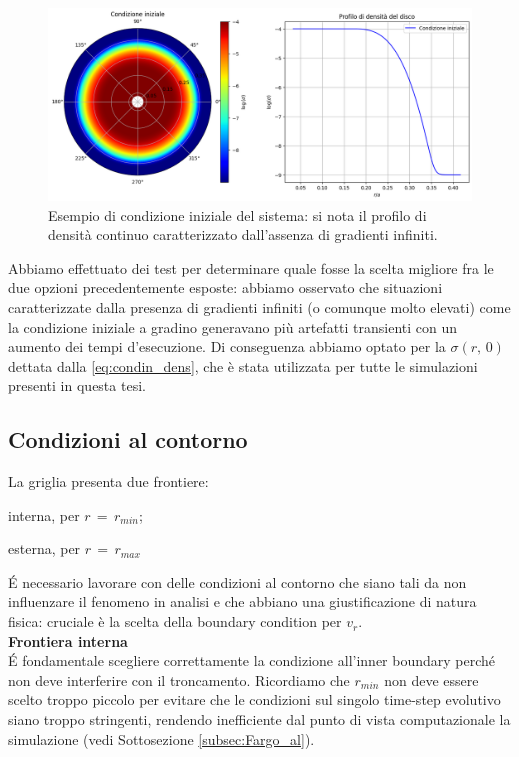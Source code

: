 \begin{figure}[h]
    \centering
    \includegraphics[width=\textwidth]{Immagini/Simulazioni/CondizioneIniziale.png}
    \caption{Esempio di condizione iniziale del sistema: si nota il profilo di densità continuo caratterizzato dall'assenza di gradienti infiniti.}
    \label{fig:cond_in_sim}
\end{figure}
Abbiamo effettuato dei test per determinare quale fosse la scelta migliore fra le due opzioni precedentemente esposte: abbiamo osservato che situazioni caratterizzate dalla presenza di gradienti infiniti (o comunque molto elevati) come la condizione iniziale a gradino generavano più artefatti transienti con un aumento dei tempi d'esecuzione.
Di conseguenza abbiamo optato per la $\sigma(r,\,0)$ dettata dalla \eqref{eq:condin_dens}, che è stata utilizzata per tutte le simulazioni presenti in questa tesi.


\subsection{Condizioni al contorno}

La griglia presenta due frontiere:
\begin{list}{\textbf{-}}{\setlength{\itemsep}{0cm}}
    \item interna, per $r\,=\,r_{min}$;
    \item esterna, per $r\,=\,r_{max}$
\end{list}
\'E necessario lavorare con delle condizioni al contorno che siano tali da non influenzare il fenomeno in analisi e che abbiano una giustificazione di natura fisica: cruciale è la scelta della boundary condition per $v_r$. \\

\textbf{Frontiera interna}\\

\'E fondamentale scegliere correttamente la condizione all'inner boundary perché non deve interferire con il troncamento. Ricordiamo che $r_{min}$ non deve essere scelto troppo piccolo per evitare che le condizioni sul singolo time-step evolutivo siano troppo stringenti, rendendo inefficiente dal punto di vista computazionale la simulazione (vedi Sottosezione \ref{subsec:Fargo_al}).

